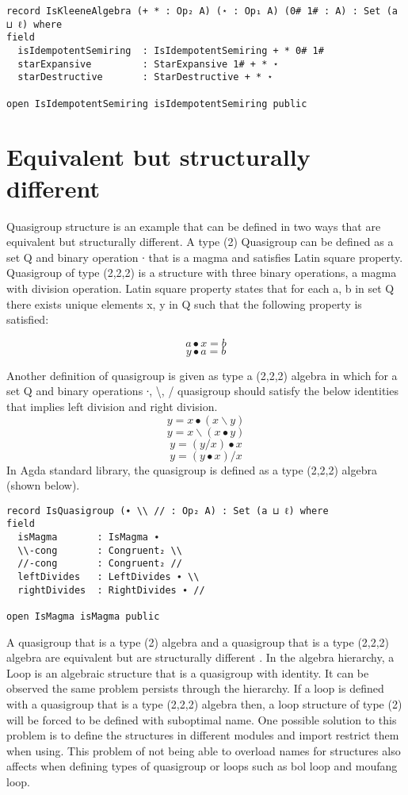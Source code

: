 \begin{verbatim}
record IsKleeneAlgebra (+ * : Op₂ A) (⋆ : Op₁ A) (0# 1# : A) : Set (a ⊔ ℓ) where
field
  isIdempotentSemiring  : IsIdempotentSemiring + * 0# 1#
  starExpansive         : StarExpansive 1# + * ⋆
  starDestructive       : StarDestructive + * ⋆

open IsIdempotentSemiring isIdempotentSemiring public
\end{verbatim}

\section{Equivalent but structurally different}
Quasigroup structure is an example that can be defined in two ways that are
equivalent but structurally different. A type (2) Quasigroup can be defined as a
set Q and binary operation ∙ that is a magma and satisfies Latin square
property. Quasigroup of type (2,2,2) is a structure with three binary
operations, a magma with division operation. Latin square property states that
for each a, b in set Q there exists unique elements x, y in Q such that the
following property is satisfied:
\cite{quasigroupWiki}
\begin{center}
\[a ∙ x = b\]
\[y ∙ a = b\]
\end{center}
Another definition of quasigroup is given as type a (2,2,2) algebra in which for a
set Q and binary operations ∙, \textbackslash{}, / quasigroup should satisfy
the below identities that implies left division and right division. 
\[y = x ∙ (x \backslash y)\]
\[y = x \backslash (x ∙ y)\]
\[y = (y / x) ∙ x\]
\[y = (y ∙ x) / x\] 
In Agda standard library, the quasigroup is defined as a
type (2,2,2) algebra (shown below).

\begin{verbatim}
record IsQuasigroup (∙ \\ // : Op₂ A) : Set (a ⊔ ℓ) where
field
  isMagma       : IsMagma ∙
  \\-cong       : Congruent₂ \\
  //-cong       : Congruent₂ //
  leftDivides   : LeftDivides ∙ \\
  rightDivides  : RightDivides ∙ //

open IsMagma isMagma public
\end{verbatim}

A quasigroup that is a type (2) algebra and a quasigroup that is a type (2,2,2)
algebra are equivalent but are structurally different \cite{flinn2021algebraic}. In the
algebra hierarchy, a Loop is an algebraic structure that is a quasigroup with
identity. It can be observed the same problem persists through the hierarchy. If
a loop is defined with a quasigroup that is a type (2,2,2) algebra then, a
loop structure of type (2) will be forced to be defined with suboptimal name.
One possible solution to this problem is to define the structures in different
modules and import restrict them when using. This problem of not being able to
overload names for structures also affects when defining types of quasigroup or
loops such as bol loop and moufang loop.

